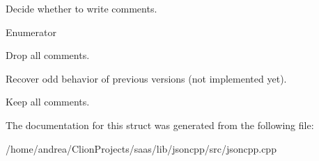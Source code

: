 Decide whether to write comments. 

\begin{Desc}
\item[Enumerator]\par
\begin{description}
\item[{\em 
None\hypertarget{struct_json_1_1_comment_style_a51fc08f3518fd81eba12f340d19a3d0cac8b32a8bae63414c8647d4919da8d437}{}\label{struct_json_1_1_comment_style_a51fc08f3518fd81eba12f340d19a3d0cac8b32a8bae63414c8647d4919da8d437}
}]Drop all comments. \item[{\em 
Most\hypertarget{struct_json_1_1_comment_style_a51fc08f3518fd81eba12f340d19a3d0cac65238f050773c107690a456e9c05c98}{}\label{struct_json_1_1_comment_style_a51fc08f3518fd81eba12f340d19a3d0cac65238f050773c107690a456e9c05c98}
}]Recover odd behavior of previous versions (not implemented yet). \item[{\em 
All\hypertarget{struct_json_1_1_comment_style_a51fc08f3518fd81eba12f340d19a3d0ca32302c0b97190c1808b3e38f367fef01}{}\label{struct_json_1_1_comment_style_a51fc08f3518fd81eba12f340d19a3d0ca32302c0b97190c1808b3e38f367fef01}
}]Keep all comments. \end{description}
\end{Desc}


The documentation for this struct was generated from the following file\+:\begin{DoxyCompactItemize}
\item 
/home/andrea/\+Clion\+Projects/saas/lib/jsoncpp/src/jsoncpp.\+cpp\end{DoxyCompactItemize}
